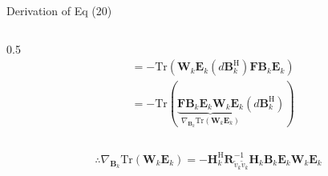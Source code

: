 \documentclass[aspectratio=169, 10pt]{beamer}
\begin{document}
\begin{frame}[label=app-wmmse-grad1]{Derivation of Eq (20)}
\begin{columns}
\begin{column}{0.5\paperwidth}
\begin{align*}
                 & = -\mathrm{Tr}\left(\mathbf{W}_k \mathbf{E}_k \left(d\mathbf{B}_k^{\mathrm{H}} \right) \mathbf{F} \mathbf{B}_k\mathbf{E}_k\right)                                                                                         \\
                 & = -\mathrm{Tr}\left( \underbrace{\mathbf{F} \mathbf{B}_k\mathbf{E}_k\mathbf{W}_k \mathbf{E}_k}_{\nabla_{\mathbf{B}_k}\mathrm{Tr}\left(\mathbf{W}_k \mathbf{E}_k\right)} \left(d\mathbf{B}_k^{\mathrm{H}}  \right) \right)
            \end{align*}
        \end{column}
    \end{columns}

    \vspace{2ex}

    \begin{equation}
        \therefore
        \nabla_{\mathbf{B}_k}\mathrm{Tr}\left(\mathbf{W}_k \mathbf{E}_k\right)
        = -\mathbf{H}_k^\mathrm{H} \mathbf{R}_{\tilde{v}_k\tilde{v}_k}^{-1} \mathbf{H}_k \mathbf{B}_k \mathbf{E}_k\mathbf{W}_k \mathbf{E}_k
        \tag{20}
    \end{equation}

    \begin{flushright}
        \hyperlink{main-wmmse-grad}{}
    \end{flushright}

    \vspace{-8ex}
\end{frame}
\end{document}
